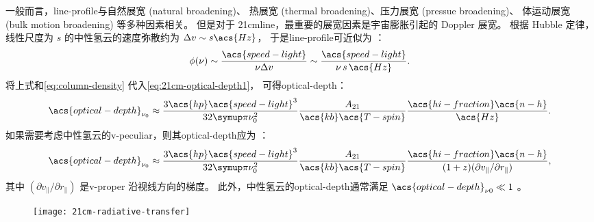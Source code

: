 一般而言，\ac{line-profile}与自然展宽 (natural broadening)、
热展宽 (thermal broadening)、压力展宽 (pressue broadening)、
体运动展宽 (bulk motion broadening) 等多种因素相关。
但是对于 \ac{21cmline}，最重要的展宽因素是宇宙膨胀引起的 Doppler 展宽。
根据 Hubble 定律，线性尺度为 $s$ 的中性氢云的速度弥散约为
$\Delta v \sim s \acs{Hz}$，
于是\ac{line-profile}可近似为 \cite{furlanetto2006,morales2010}：
\begin{equation}
  \phi(\nu) \sim \frac{\acs{speed-light}}{\nu \Delta v}
    \sim \frac{\acs{speed-light}}{\nu \, s \,\acs{Hz}} .
\end{equation}
将上式和\autoref{eq:column-density} 代入\autoref{eq:21cm-optical-depth1}，
可得\acl{optical-depth}：
\begin{equation}
  \label{eq:21cm-optical-depth2}
  \acs{optical-depth}_{\nu_0}
    \approx \frac{3 \acs{hp} \acs{speed-light}^3}{32\Cpi \nu_0^2}
      \frac{A_{21}}{\acs{kb} \acs{T-spin}}
      \frac{\acs{hi-fraction} \acs{n-h}}{\acs{Hz}} .
\end{equation}
如果需要考虑中性氢云的\ac{v-peculiar}，则其\acl{optical-depth}应为
\cite{bharadwaj2005,furlanetto2006,pritchard2012}：
\begin{equation}
  \label{eq:21cm-optical-depth3}
  \acs{optical-depth}_{\nu_0}
    \approx \frac{3 \acs{hp} \acs{speed-light}^3}{32\Cpi \nu_0^2}
      \frac{A_{21}}{\acs{kb} \acs{T-spin}}
      \frac{\acs{hi-fraction} \acs{n-h}}{
        (1+z) (\partial v_{\parallel} / \partial r_{\parallel})} ,
\end{equation}
其中 $(\partial v_{\parallel} / \partial r_{\parallel})$ 是\ac{v-proper}
沿视线方向的梯度。
此外，中性氢云的\acl{optical-depth}通常满足
$\acs{optical-depth}_{\nu0} \ll 1$
\cite{madau1997,furlanetto2006,pritchard2010mn}。

\begin{figure}[htp]
  \centering
  \texttt{[image: 21cm-radiative-transfer]}
  \label{fig:21cm-cmb-rt}
\end{figure}

